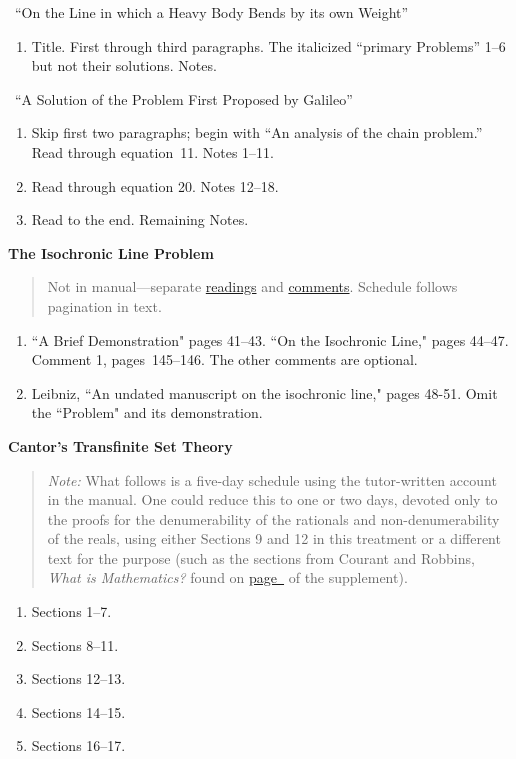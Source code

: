 \documentclass[10pt]{article}
\begin{document}
{\ ``On the Line in which a Heavy Body Bends
by its own Weight''
\begin{enumerate}[noitemsep]  \item Title.
		First through third paragraphs. The
		italicized ``primary Problems'' 1--6 but not
		their solutions. Notes.  \end{enumerate} 

\ ``A Solution of the Problem First Proposed by
Galileo'' 
\begin{enumerate}[resume*]
	\item Skip first two paragraphs; begin with ``An analysis of the
	chain problem.'' Read through equation~11. Notes
	1--11. 
\item Read through equation 20. Notes
	12--18. \item Read to the end. Remaining
	Notes.
	\end{enumerate} 
\textbf{The Isochronic Line Problem}
\label{LeibnizIso}
\vspace{-0.7em} 
\begin{quote}
{\small Not in manual---separate \href{https://drive.google.com/file/d/13w3nTIpDN1F0sgImLWWRaLF5vg2cF6BL/view?usp=sharing}{readings} and \href{https://drive.google.com/file/d/140fF6SF7omRfQ-sFkhHiBlaNOiBiNvUq/view?usp=sharing}{comments}. Schedule follows pagination in text.}
\end{quote}

\vspace{-0.7em}

\begin{enumerate}
\item ``A Brief Demonstration" pages 41--43. ``On the Isochronic Line," pages 44--47.
Comment 1, pages~145--146.  The other comments are optional.

\item Leibniz, ``An undated manuscript on the isochronic line," pages 48-51.
Omit the ``Problem" and its demonstration.
\end{enumerate}


\textbf{Cantor's Transfinite Set Theory}
\label{Cantor}
\vspace{-0.7em}
\begin{quote}
	\small{\emph{Note:} What follows is a five-day schedule 
using the tutor-written account 
in the manual. One could reduce this to one or two days,
devoted only to the proofs for the denumerability of
the rationals and non-denumerability of the reals,
using either 
Sections 9 and 12 in this treatment or
a different text for the purpose  (such as
the sections from Courant and Robbins, \emph{What
	is Mathematics?} found on
\hyperref[supple.59]{page~\pageref{supple.59}} of the
supplement).}
\end{quote}
\begin{enumerate}[noitemsep]
	\item Sections 1--7.
	\item Sections 8--11.
	\item Sections 12--13.
	\item Sections 14--15.
	\item Sections 16--17.
\end{enumerate}

}
\end{document}
